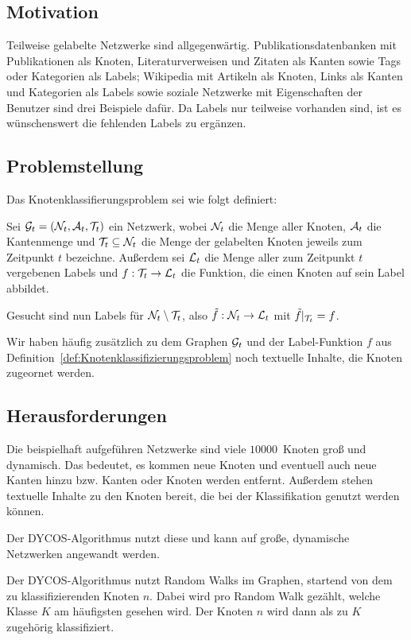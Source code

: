 \subsection{Motivation}
Teilweise gelabelte Netzwerke sind allgegenwärtig. Publikationsdatenbanken
mit Publikationen als Knoten, Literaturverweisen und Zitaten als Kanten
sowie Tags oder Kategorien als Labels;
Wikipedia mit Artikeln als Knoten, Links als Kanten und Kategorien
als Labels sowie soziale Netzwerke mit Eigenschaften der Benutzer
sind drei Beispiele dafür.
Da Labels nur teilweise vorhanden sind, ist es wünschenswert die 
fehlenden Labels zu ergänzen. 

\subsection{Problemstellung}
Das Knotenklassifierungsproblem sei wie folgt definiert:\\

\begin{definition}[Knotenklassifierungsproblem]\label{def:Knotenklassifizierungsproblem}
    Sei $\mathcal{G}_t = (\mathcal{N}_t, \mathcal{A}_t, \mathcal{T}_t)$ ein Netzwerk,
    wobei $\mathcal{N}_t$ die Menge aller Knoten,
    $\mathcal{A}_t$ die Kantenmenge und $\mathcal{T}_t \subseteq \mathcal{N}_t$ die Menge der 
    gelabelten Knoten jeweils zum Zeitpunkt $t$ bezeichne.
    Außerdem sei $\mathcal{L}_t$ die Menge aller zum Zeitpunkt $t$ vergebenen
    Labels und $f:\mathcal{T}_t \rightarrow \mathcal{L}_t$ die Funktion, die einen
    Knoten auf sein Label abbildet.

    Gesucht sind nun Labels für $\mathcal{N}_t \setminus \mathcal{T}_t$, also
    $\tilde{f}:\mathcal{N}_t \rightarrow \mathcal{L}_t$ mit 
    $\tilde{f}|_{\mathcal{T}_t} = f$.
\end{definition}

Wir haben häufig zusätzlich zu dem Graphen $\mathcal{G}_t$ und der Label-Funktion
$f$ aus Definition~\ref{def:Knotenklassifizierungsproblem} noch
textuelle Inhalte, die Knoten zugeornet werden. 


\subsection{Herausforderungen}
Die beispielhaft aufgeführen Netzwerke sind viele 
$\num{10000}$~Knoten groß und dynamisch. Das bedeutet, es kommen
neue Knoten und eventuell auch neue Kanten hinzu bzw. Kanten oder
Knoten werden entfernt. Außerdem stehen textuelle Inhalte zu den 
Knoten bereit, die bei der Klassifikation genutzt werden können.

Der DYCOS-Algorithmus nutzt diese und kann auf große, dynamische
Netzwerken angewandt werden.

Der DYCOS-Algorithmus nutzt Random Walks im Graphen, startend 
von dem zu klassifizierenden Knoten $n$. Dabei wird pro Random Walk
gezählt, welche Klasse $K$ am häufigsten gesehen wird. Der Knoten $n$
wird dann als zu $K$ zugehörig klassifiziert.

